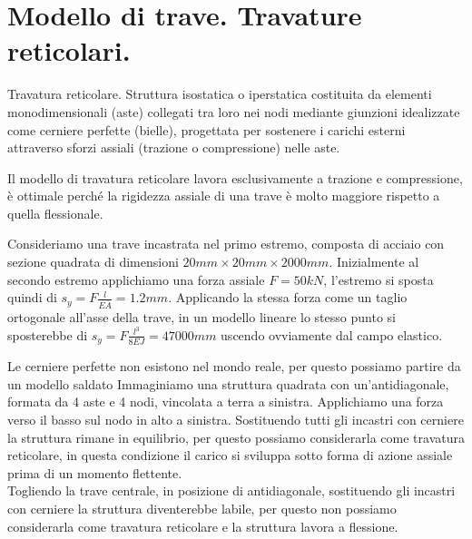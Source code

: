 \section{Modello di trave. Travature reticolari.}

\begin{definizioneBox}
    Travatura reticolare. Struttura isostatica o iperstatica costituita da elementi monodimensionali (aste) collegati tra loro nei nodi mediante giunzioni idealizzate come cerniere perfette (bielle), progettata per sostenere i carichi esterni  attraverso sforzi assiali (trazione o compressione) nelle aste.
\end{definizioneBox}

Il modello di travatura reticolare lavora esclusivamente a trazione e compressione, è ottimale perché la rigidezza assiale di una trave è molto maggiore rispetto a quella flessionale.

\begin{esempioBox}
    Consideriamo una trave incastrata nel primo estremo, composta di acciaio con sezione quadrata di dimensioni $20mm\times 20mm\times 2000mm$. Inizialmente al secondo estremo applichiamo una forza assiale $F = 50kN$, l'estremo si sposta quindi di $s_y = F \frac{l}{E\bar{A}}= 1.2mm$. Applicando la stessa forza come un taglio ortogonale all'asse della trave, in un modello lineare lo stesso punto si sposterebbe di $s_y = F \frac{l^3}{8EJ} = 47000mm$ uscendo ovviamente dal campo elastico.
\end{esempioBox} 

\begin{esempioBox}
    Le cerniere perfette non esistono nel mondo reale, per questo possiamo partire da un modello saldato Immaginiamo una struttura quadrata con un'antidiagonale, formata da 4 aste e 4 nodi, vincolata a terra a sinistra. Applichiamo una forza verso il basso sul nodo in alto a sinistra. Sostituendo tutti gli incastri con cerniere la struttura rimane in equilibrio, per questo possiamo considerarla come travatura reticolare, in questa condizione il carico si sviluppa sotto forma di azione assiale prima di un momento flettente.\\
    Togliendo la trave centrale, in posizione di antidiagonale, sostituendo gli incastri con cerniere la struttura diventerebbe labile, per questo non possiamo considerarla come travatura reticolare e la struttura lavora a flessione.
\end{esempioBox}







